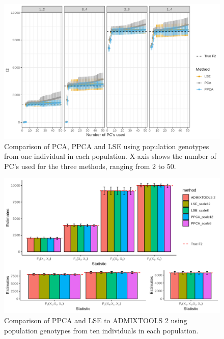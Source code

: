 \documentclass[12pt, letterpaper]{article}
\begin{document}
\begin{figure}[ht!]
    \includegraphics[width=16.5cm]{plots/supplementary/Ne1000_split_times1000_npop10_nind100_mu0_f2_plot_scale_test_ind.png}
    \centering
    \caption{Comparison of PCA, PPCA and LSE using population genotypes from one individual in each population. X-axis shows the number of PC's used for the three methods, ranging from 2 to 50.}
    \label{figS2:pc_scale}
\end{figure}


\begin{figure}[ht!]
    \includegraphics[width=16.5cm]{plots/simfiles/Ne1000/split_times1000/npop10_nind100/plots_8_12/mu0.05_plot_all.png}
    \centering
    \caption{Comparison of PPCA and LSE to ADMIXTOOLS 2 using population genotypes from ten individuals in each population.}
    \label{figS2:pc_scale}
\end{figure}
\end{document}
